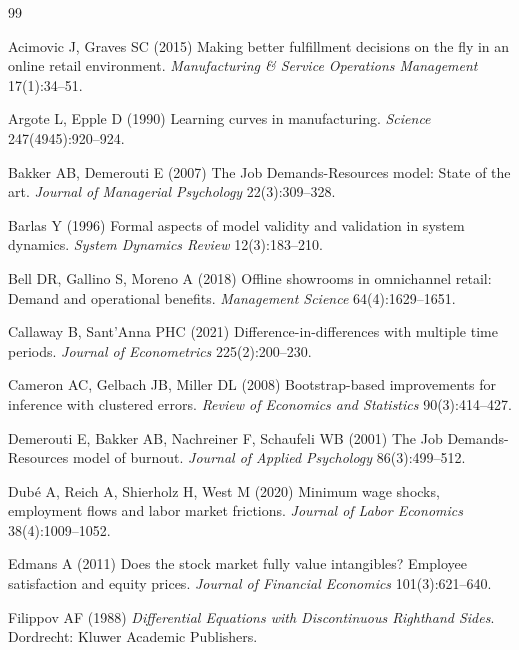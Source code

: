 \documentclass[msom,dblanonrev]{informs4}
\def\bibsep{\smallskipamount}%
\begin{document}
\SingleSpacedXI
{\footnotesize\setlength{\bibsep}{1pt}
\begin{thebibliography}{99}

Acimovic J, Graves SC (2015) Making better fulfillment decisions on the fly in an online retail environment.
\textit{Manufacturing \& Service Operations Management} 17(1):34--51.

Argote L, Epple D (1990) Learning curves in manufacturing.
\textit{Science} 247(4945):920--924.

Bakker AB, Demerouti E (2007) The Job Demands-Resources model: State of the art.
\textit{Journal of Managerial Psychology} 22(3):309--328.

Barlas Y (1996) Formal aspects of model validity and validation in system dynamics.
\textit{System Dynamics Review} 12(3):183--210.

Bell DR, Gallino S, Moreno A (2018) Offline showrooms in omnichannel retail: Demand and operational benefits.
\textit{Management Science} 64(4):1629--1651.

Callaway B, Sant'Anna PHC (2021) Difference-in-differences with multiple time periods.
\textit{Journal of Econometrics} 225(2):200--230.

Cameron AC, Gelbach JB, Miller DL (2008) Bootstrap-based improvements for inference with clustered errors.
\textit{Review of Economics and Statistics} 90(3):414--427.

Demerouti E, Bakker AB, Nachreiner F, Schaufeli WB (2001) The Job Demands-Resources model of burnout.
\textit{Journal of Applied Psychology} 86(3):499--512.

Dub{\'{e}} A, Reich A, Shierholz H, West M (2020) Minimum wage shocks, employment flows and labor market frictions.
\textit{Journal of Labor Economics} 38(4):1009--1052.

Edmans A (2011) Does the stock market fully value intangibles? Employee satisfaction and equity prices.
\textit{Journal of Financial Economics} 101(3):621--640.

Filippov AF (1988) \textit{Differential Equations with Discontinuous Righthand Sides}.
Dordrecht: Kluwer Academic Publishers.


\end{thebibliography}}
\end{document}
